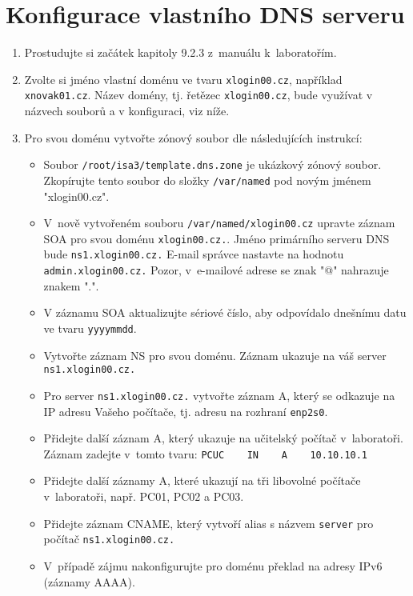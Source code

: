 \section{Konfigurace vlastního DNS serveru}
\begin{enumerate}
  \item Prostudujte si začátek kapitoly 9.2.3 z~manuálu k~laboratořím.
  \item Zvolte si jméno vlastní doménu ve tvaru {\tt xlogin00.cz}, například {\tt xnovak01.cz}. Název domény, tj. řetězec {\tt xlogin00.cz}, bude využívat v názvech souborů a v konfiguraci, viz níže.

\item Pro svou doménu vytvořte zónový soubor dle následujících instrukcí:
    \begin{itemize}
      \item Soubor {\tt /root/isa3/template.dns.zone} je ukázkový zónový soubor. Zkopírujte tento soubor do složky {\tt /var/named} pod novým jménem "xlogin00.cz".
      \item V~nově vytvořeném souboru {\tt /var/named/xlogin00.cz} upravte záznam SOA pro svou doménu {\tt xlogin00.cz.}. Jméno primárního serveru DNS bude {\tt ns1.xlogin00.cz.} E-mail správce nastavte na hodnotu {\tt admin.xlogin00.cz.} Pozor, v~e-mailové adrese se znak "@" nahrazuje znakem ".".
      \item V záznamu SOA aktualizujte sériové číslo, aby odpovídalo dnešnímu datu ve tvaru {\tt yyyymmdd}.
      \item Vytvořte záznam NS pro svou doménu. Záznam ukazuje na váš server {\tt ns1.xlogin00.cz.}
      \item Pro server {\tt ns1.xlogin00.cz.} vytvořte záznam A, který se odkazuje na IP adresu Vašeho počítače, tj. adresu na rozhraní {\tt enp2s0}. 
      \item Přidejte další záznam A, který ukazuje na učitelský počítač v~laboratoři. Záznam zadejte v~tomto tvaru: \verb|PCUC    IN    A    10.10.10.1|
      \item Přidejte další záznamy A, které ukazují na tři libovolné počítače v~laboratoři, např. PC01, PC02 a PC03.
      \item Přidejte záznam CNAME, který vytvoří alias s názvem {\tt server} pro počítač {\tt ns1.xlogin00.cz.}
      \item V~případě zájmu nakonfigurujte pro doménu překlad na adresy IPv6 (záznamy AAAA).
    \end{itemize}
  

\end{enumerate}
